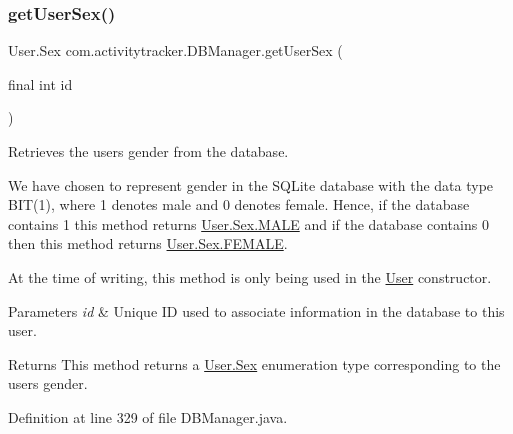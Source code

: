 \subsubsection{\texorpdfstring{getUserSex()}{getUserSex()}}
{\footnotesize\ttfamily User.\+Sex com.\+activitytracker.\+D\+B\+Manager.\+get\+User\+Sex (\begin{DoxyParamCaption}\item[{final int}]{id }\end{DoxyParamCaption})}

Retrieves the user\textquotesingle{}s gender from the database.

We have chosen to represent gender in the S\+Q\+Lite database with the data type B\+IT(1), where 1 denotes male and 0 denotes female. Hence, if the database contains 1 this method returns \mbox{\hyperlink{enumcom_1_1activitytracker_1_1_user_1_1_sex_ad3b626a38bd4615eb621d75b939f412d}{User.\+Sex.\+M\+A\+LE}} and if the database contains 0 then this method returns \mbox{\hyperlink{enumcom_1_1activitytracker_1_1_user_1_1_sex_a5c22ece8a4df71ed5202cd492990a752}{User.\+Sex.\+F\+E\+M\+A\+LE}}.

At the time of writing, this method is only being used in the \mbox{\hyperlink{classcom_1_1activitytracker_1_1_user}{User}} constructor.


\begin{DoxyParams}{Parameters}
{\em id} & Unique ID used to associate information in the database to this user.\\
\hline
\end{DoxyParams}
\begin{DoxyReturn}{Returns}
This method returns a \mbox{\hyperlink{enumcom_1_1activitytracker_1_1_user_1_1_sex}{User.\+Sex}} enumeration type corresponding to the user\textquotesingle{}s gender. 
\end{DoxyReturn}


Definition at line 329 of file D\+B\+Manager.\+java.


